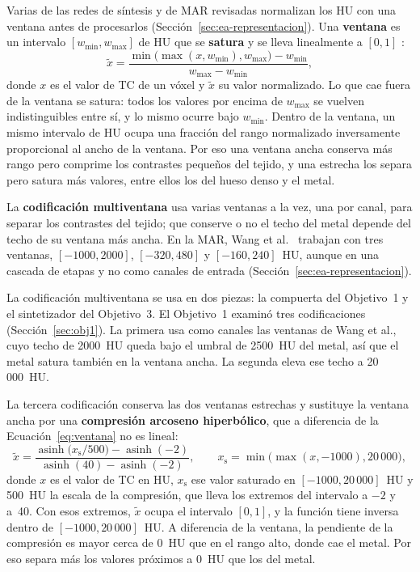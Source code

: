 Varias de las redes de síntesis y de MAR revisadas normalizan los HU con una ventana antes de procesarlos (Sección~\ref{sec:ea-representacion}). Una \textbf{ventana} es un intervalo $[w_{\min}, w_{\max}]$ de HU que se \textbf{satura} y se lleva linealmente a $[0, 1]$ \cite{wang2025adaptiveweighting}:
\begin{equation}
\tilde{x} = \frac{\min\bigl(\max(x, w_{\min}), w_{\max}\bigr) - w_{\min}}{w_{\max} - w_{\min}},
\label{eq:ventana}
\end{equation}
donde $x$ es el valor de TC de un vóxel y $\tilde{x}$ su valor normalizado. Lo que cae fuera de la ventana se satura: todos los valores por encima de $w_{\max}$ se vuelven indistinguibles entre sí, y lo mismo ocurre bajo $w_{\min}$. Dentro de la ventana, un mismo intervalo de HU ocupa una fracción del rango normalizado inversamente proporcional al ancho de la ventana. Por eso una ventana ancha conserva más rango pero comprime los contrastes pequeños del tejido, y una estrecha los separa pero satura más valores, entre ellos los del hueso denso y el metal.

La \textbf{codificación multiventana} usa varias ventanas a la vez, una por canal, para separar los contrastes del tejido; que conserve o no el techo del metal depende del techo de su ventana más ancha. En la MAR, Wang et al.~\cite{wang2025adaptiveweighting} trabajan con tres ventanas, $[-1000, 2000]$, $[-320, 480]$ y $[-160, 240]$~HU, aunque en una cascada de etapas y no como canales de entrada (Sección~\ref{sec:ea-representacion}).

La codificación multiventana se usa en dos piezas: la compuerta del Objetivo~1 y el sintetizador del Objetivo~3. El Objetivo~1 examinó tres codificaciones (Sección~\ref{sec:obj1}). La primera usa como canales las ventanas de Wang et al., cuyo techo de 2000~HU queda bajo el umbral de 2500~HU del metal, así que el metal satura también en la ventana ancha. La segunda eleva ese techo a 20\,000~HU.

La tercera codificación conserva las dos ventanas estrechas y sustituye la ventana ancha por una \textbf{compresión arcoseno hiperbólico}, que a diferencia de la Ecuación~\ref{eq:ventana} no es lineal:
\begin{equation}
\tilde{x} = \frac{\operatorname{asinh}\bigl(x_{\mathrm{s}}/500\bigr) - \operatorname{asinh}(-2)}{\operatorname{asinh}(40) - \operatorname{asinh}(-2)}, \qquad x_{\mathrm{s}} = \min\bigl(\max(x, -1000), 20\,000\bigr),
\label{eq:asinh}
\end{equation}
donde $x$ es el valor de TC en HU, $x_{\mathrm{s}}$ ese valor saturado en $[-1000, 20\,000]$~HU y 500~HU la escala de la compresión, que lleva los extremos del intervalo a $-2$ y a~40. Con esos extremos, $\tilde{x}$ ocupa el intervalo $[0, 1]$, y la función tiene inversa dentro de $[-1000, 20\,000]$~HU. A diferencia de la ventana, la pendiente de la compresión es mayor cerca de 0~HU que en el rango alto, donde cae el metal. Por eso separa más los valores próximos a 0~HU que los del metal.

